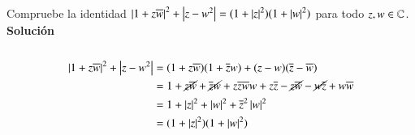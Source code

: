     \begin{ex}[H1.3]
        Compruebe la identidad $\left|1+z\overline{w}\right|^2 + \left|z-w^2\right| = (1+\left|z\right|^2)(1+\left|w\right|^2)$ para todo $z, w \in \mathbb{C}$.\\

        \textbf{Solución}\\\\
        \begin{align*}
            \left|1+z\overline{w}\right|^2 + \left|z-w^2\right| &= (1+z\overline{w})(1+\overline{z} w) + (z-w)(\overline{z} - \overline{w})\\
            &= 1+ \cancel{z\overline{w}} + \cancel{\overline{z} w} + z\overline{z}\overline{w}w + z\overline{z} - \cancel{z\overline{w}} - \cancel{w\overline{z}} + w\overline{w} \\
            &= 1 + \left|z\right|^2 + \left|w\right|^2 + \overline{z}^2\left|w\right|^2\\
            &= (1+\left|z\right|^2)(1+\left|w\right|^2)
        \end{align*}
    \end{ex}


